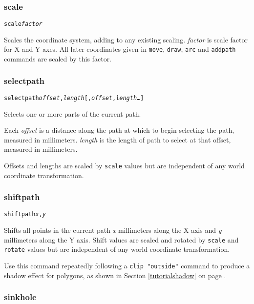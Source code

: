 \subsubsection{scale}

\begin{alltt}
scale \textit{factor}
\end{alltt}

Scales the coordinate system, adding to any existing scaling.  \textit{factor}
is scale factor for X and Y axes.  All later coordinates given in
\texttt{move}, \texttt{draw}, \texttt{arc} and \texttt{addpath} commands are
scaled by this factor.

\subsubsection{selectpath}

\begin{alltt}
selectpath \textit{offset}, \textit{length} [, \textit{offset}, \textit{length}  \dots ]
\end{alltt}

Selects one or more parts of the current path.

Each \textit{offset} is a distance along the path at which to begin selecting
the path, measured in millimeters.
\textit{length} is the length of path to select at that offset, measured
in millimeters.

Offsets and lengths are scaled by \texttt{scale} values but are independent of
any world coordinate transformation.

\subsubsection{shiftpath}

\begin{alltt}
shiftpath \textit{x}, \textit{y}
\end{alltt}

Shifts all points in the current path \textit{x} millimeters along the X axis
and \textit{y} millimeters along the Y axis.  Shift values are scaled and
rotated by \texttt{scale} and \texttt{rotate} values but are independent
of any world coordinate transformation.

Use this command
repeatedly following a \texttt{clip "outside"} command to produce a shadow
effect for polygons, as shown in 
Section \ref{tutorialshadow} on page \pageref{tutorialshadow}.

\subsubsection{sinkhole}

